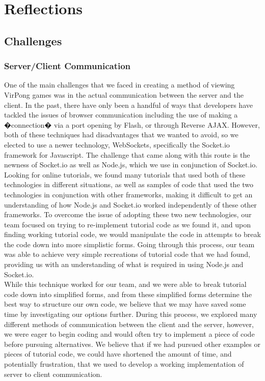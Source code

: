 %

\section{Reflections}

	\subsection{Challenges}
	
		\subsubsection{Server/Client Communication}
			One of the main challenges that we faced in creating a method of viewing VirPong games was in the actual communication between the server and the client. In the past, there have only been a handful of ways that developers have tackled the issues of browser communication including the use of making a �connection� via a port opening by Flash, or through Reverse AJAX. However, both of these techniques had disadvantages that we wanted to avoid, so we elected to use a newer technology, WebSockets, specifically the Socket.io framework for Javascript. The challenge that came along with this route is the newness of Socket.io as well as Node.js, which we use in conjunction of Socket.io. Looking for online tutorials, we found many tutorials that used both of these technologies in different situations, as well as samples of code that used the two technologies in conjunction with other frameworks, making it difficult to get an understanding of how Node.js and Socket.io worked independently of these other frameworks. To overcome the issue of adopting these two new technologies, our team focused on trying to re-implement tutorial code as we found it, and upon finding working tutorial code, we would manipulate the code in attempts to break the code down into more simplistic forms. Going through this process, our team was able to achieve very simple recreations of tutorial code that we had found, providing us with an understanding of what is required in using Node.js and Socket.io.\\While this technique worked for our team, and we were able to break tutorial code down into simplified forms, and from these simplified forms determine the best way to structure our own code, we believe that we may have saved some time by investigating our options further. During this process, we explored many different methods of communication between the client and the server, however, we were eager to begin coding and would often try to implement a piece of code before pursuing alternatives. We believe that if we had pursued other examples or pieces of tutorial code, we could have shortened the amount of time, and potentially frustration, that we used to develop a working implementation of server to client communication.


